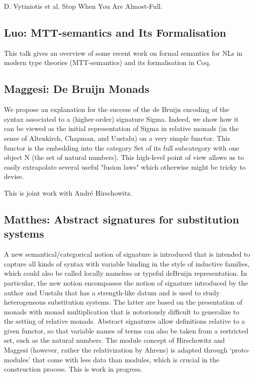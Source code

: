 \documentclass[a4paper,10pt]{scrartcl}
\begin{document}
\noindent
[4] D. Vytiniotis et al. Stop When You Are Almost-Full.


\subsection*{Luo: MTT-semantics and Its Formalisation}

This talk gives an overview of some recent work on formal semantics for NLs in modern type theories (MTT-semantics) and its formalisation in Coq.

\subsection*{Maggesi: De Bruijn Monads}

We propose an explanation for the success of the de Bruijn encoding of the syntax associated to a (higher-order) signature Sigma. 
Indeed, we show how it can be viewed as the initial representation of Sigma in relative monads (in the sense of Altenkirch, Chapman, and Uustalu) on a very simple functor.  
This functor is the embedding into the category Set of its full subcategory with one object N (the set of natural numbers).  
This high-level point of view allows us to easily extrapolate several useful "fusion laws" which otherwise might be tricky to devise.

This is joint work with André Hirschowitz.

\subsection*{Matthes: Abstract signatures for substitution systems}

A new semantical/categorical notion of signature is introduced that is intended to capture all kinds of syntax with variable binding in the style of inductive families, 
which could also be called locally nameless or typeful deBruijn representation. 
In particular, the new notion encompasses the notion of signature introduced by the author and Uustalu that has a strength-like datum and is used to study heterogeneous substitution systems. 
The latter are based on the presentation of monads with monad multiplication that is notoriously difficult to generalize to the setting of relative monads. 
Abstract signatures allow definitions relative to a given functor, so that variable names of terms can also be taken from a restricted set, such as the natural numbers. 
The module concept of Hirschowitz and Maggesi (however, rather the relativization by Ahrens) is adapted through `proto-modules' that come with less data than modules, 
which is crucial in the construction process. This is work in progress.
\end{document}
